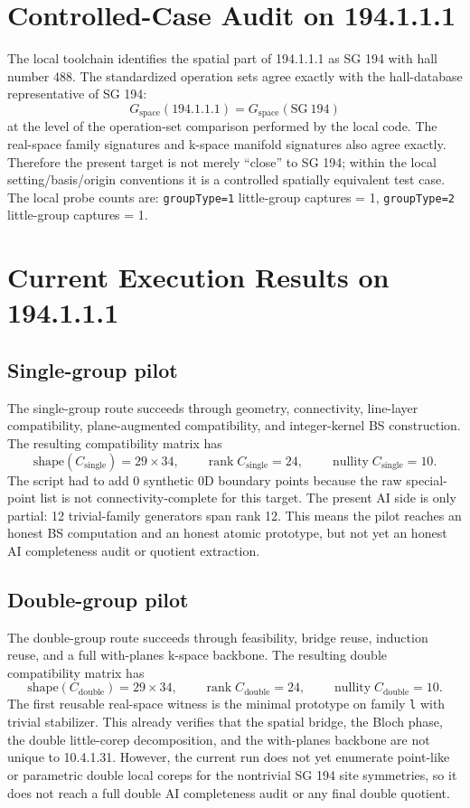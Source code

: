 \documentclass[11pt]{article}
\begin{document}
\section{Controlled-Case Audit on 194.1.1.1}
The local toolchain identifies the spatial part of 194.1.1.1 as SG 194 with hall number 488. The standardized operation sets agree exactly with the hall-database representative of SG 194:
\[
G_{\mathrm{space}}(194.1.1.1) = G_{\mathrm{space}}(\mathrm{SG}\ 194)
\]
at the level of the operation-set comparison performed by the local code. The real-space family signatures and k-space manifold signatures also agree exactly. Therefore the present target is not merely ``close'' to SG 194; within the local setting/basis/origin conventions it is a controlled spatially equivalent test case. The local probe counts are: \texttt{groupType=1} little-group captures = 1, \texttt{groupType=2} little-group captures = 1.

\section{Current Execution Results on 194.1.1.1}
\subsection*{Single-group pilot}
The single-group route succeeds through geometry, connectivity, line-layer compatibility, plane-augmented compatibility, and integer-kernel BS construction. The resulting compatibility matrix has
\[
\mathrm{shape}(C_{\mathrm{single}}) = 29 \times 34, \qquad
\operatorname{rank} C_{\mathrm{single}} = 24, \qquad
\operatorname{nullity} C_{\mathrm{single}} = 10.
\]
The script had to add 0 synthetic 0D boundary points because the raw special-point list is not connectivity-complete for this target. The present AI side is only partial: 12 trivial-family generators span rank 12. This means the pilot reaches an honest BS computation and an honest atomic prototype, but not yet an honest AI completeness audit or quotient extraction.

\subsection*{Double-group pilot}
The double-group route succeeds through feasibility, bridge reuse, induction reuse, and a full with-planes k-space backbone. The resulting double compatibility matrix has
\[
\mathrm{shape}(C_{\mathrm{double}}) = 29 \times 34, \qquad
\operatorname{rank} C_{\mathrm{double}} = 24, \qquad
\operatorname{nullity} C_{\mathrm{double}} = 10.
\]
The first reusable real-space witness is the minimal prototype on family \texttt{l} with trivial stabilizer. This already verifies that the spatial bridge, the Bloch phase, the double little-corep decomposition, and the with-planes backbone are not unique to 10.4.1.31. However, the current run does not yet enumerate point-like or parametric double local coreps for the nontrivial SG 194 site symmetries, so it does not reach a full double AI completeness audit or any final double quotient.
\end{document}
